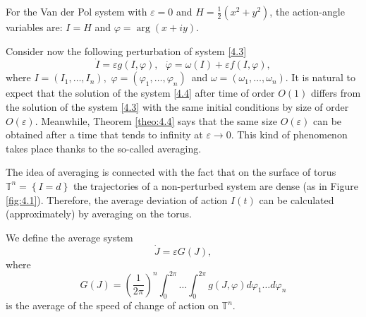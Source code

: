 \begin{example}
	For the Van der Pol system with $\varepsilon =0$ and $H=%
	\frac{1}{2}(x^{2}+y^{2})$, the action-angle variables are: $I=H$ and $\varphi =\arg (x+iy).$
	
	Consider now the following perturbation of system \eqref{4.3}
	\begin{equation}
	\label{4.4}
	\dot{I}=\varepsilon g(I,\varphi ),\text{ \ \ }\dot{\varphi}=\omega
	(I)+\varepsilon f(I,\varphi ),
	\end{equation}
	where $I=(I_{1},\ldots ,I_{n}),$ $\varphi =(\varphi _{1},\ldots ,\varphi
	_{n})$\ and $\omega =\left( \omega _{1},\ldots ,\omega _{n}\right) $.
	It is natural to expect that the solution of the system \eqref{4.4} after time of order $O(1)$ differs from the solution of the system \eqref{4.3} with the same initial conditions by size of order $O(\varepsilon )$. Meanwhile, Theorem \ref{theo:4.4} says that the same size $O(\varepsilon )$ can be obtained after a time that tends to infinity at $\varepsilon \rightarrow 0.$ This kind of phenomenon takes place thanks to the so-called averaging.
	
	The idea of averaging is connected with the fact that on the surface of torus $\mathbb{T}^{n}=\left\{ I=d\right\} $ the trajectories of a non-perturbed system are dense (as in Figure \ref{fig:4.1}). Therefore, the average deviation of action $I(t)$ can be calculated (approximately) by averaging on the torus.
\end{example}

We define the average system
\begin{equation}
\label{4.5}
\dot{J}=\varepsilon G(J),
\end{equation}
where
$$
G(J)=\left( \frac{1}{2\pi }\right) ^{n}\int_{0}^{2\pi }\ldots \int_{0}^{2\pi
}g(J,\varphi )d\varphi _{1}\ldots d\varphi _{n}
$$
is the average of the speed of change of action on $\mathbb{T}^{n}$.


